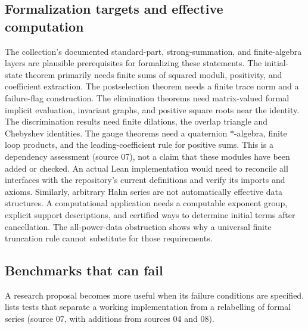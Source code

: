 \documentclass[11pt,oneside]{article}
\numberwithin{equation}{section}
\theoremstyle{plain}
\theoremstyle{definition}
\theoremstyle{remark}
\begin{document}
\subsection{Formalization targets and effective computation}\label{qgs:sec:formal}
The collection's documented standard-part, strong-summation, and finite-algebra layers are plausible prerequisites for formalizing these statements. The initial-state theorem primarily needs finite sums of squared moduli, positivity, and coefficient extraction. The postselection theorem needs a finite trace norm and a failure-flag construction. The elimination theorems need matrix-valued formal implicit evaluation, invariant graphs, and positive square roots near the identity. The discrimination results need finite dilations, the overlap triangle and Chebyshev identities. The gauge theorems need a quaternion $*$-algebra, finite loop products, and the leading-coefficient rule for positive sums. This is a dependency assessment (source 07), not a claim that these modules have been added or checked. An actual Lean implementation would need to reconcile all interfaces with the repository's current definitions and verify its imports and axioms. Similarly, arbitrary Hahn series are not automatically effective data structures. A computational application needs a computable exponent group, explicit support descriptions, and certified ways to determine initial terms after cancellation. The all-power-data obstruction shows why a universal finite truncation rule cannot substitute for those requirements.

\subsection{Benchmarks that can fail}
A research proposal becomes more useful when its failure conditions are specified.  lists tests that separate a working implementation from a relabelling of formal series (source 07, with additions from sources 04 and 08).
\end{document}
